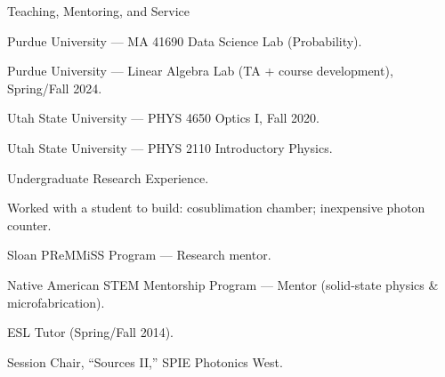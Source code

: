 \begin{rubric}{Teaching, Mentoring, and Service}


\entry*%
Purdue University --- MA 41690 Data Science Lab (Probability).\par

\entry*%
Purdue University --- Linear Algebra Lab (TA + course development), Spring/Fall 2024.\par

\entry*%
Utah State University --- PHYS 4650 Optics I, Fall 2020.\par

\entry*%
Utah State University --- PHYS 2110 Introductory Physics.\par


\entry*[Summer 2025]%
Undergraduate Research Experience.\par
Worked with a student to build: cosublimation chamber; inexpensive photon counter.\par

\entry*[Summer 2024]%
Sloan PReMMiSS Program --- Research mentor.\par

\entry*[Fall 2019]%
Native American STEM Mentorship Program --- Mentor (solid-state physics \& microfabrication).\par

\entry*[2014]%
ESL Tutor (Spring/Fall 2014).\par


\entry*[Jan 2026]%
Session Chair, ``Sources II,'' SPIE Photonics West.\par

\end{rubric}
